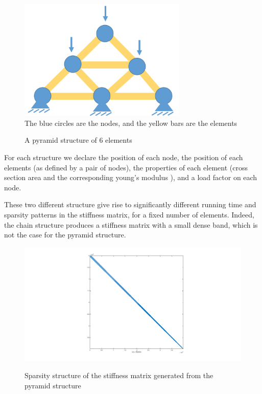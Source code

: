 \documentclass[11pt]{article}
\begin{document}
\begin{figure}[h]
\begin{center}

\caption{A pyramid structure of 6 elements}
\includegraphics[width=8cm]{pyramid}
\label{fig:pyramid}
\\
The blue circles are the nodes, and the yellow bars are the elements
\end{center}

\end{figure}



For each structure we declare the position of each node, the position of each elements (as defined by a pair of nodes), the properties of each element (cross section area and the corresponding young's modulus ), and a load factor on each node.

These two different structure give rise to significantly different running time and sparsity patterns in the stiffness matrix, for a fixed number of elements. Indeed, the chain structure produces a stiffness matrix with a small dense band, which is not the case for the pyramid structure.

\begin{figure}[H]
\begin{center}
\caption{Sparsity structure of the stiffness matrix generated from the pyramid structure}
\includegraphics[width=20cm]{pyramid-sparsity.png}
\label{fig:pyramid-sparsity}
\\
\end{center}

\end{figure}
\end{document}
